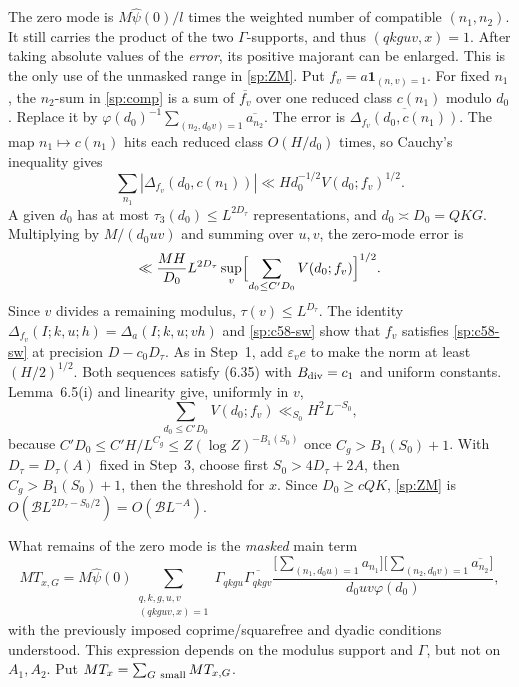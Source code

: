 The zero mode is $M\hat\psi(0)/l$ times the weighted number of compatible
$(n_1,n_2)$. It still carries the product of the two
$\Gamma$-supports, and thus $(qkguv,x)=1$. After taking absolute
values of the \emph{error}, its positive majorant can be enlarged.
This is the only use of the unmasked range in \eqref{sp:ZM}.
Put $f_v=a\mathbf1_{(n,v)=1}$. For fixed $n_1$, the
$n_2$-sum in \eqref{sp:comp} is a sum of $\overline{f_v}$ over one reduced
class $c(n_1)$ modulo $d_0$. Replace it by
$\varphi(d_0)^{-1}\sum_{(n_2,d_0v)=1}\overline{a_{n_2}}$. The error is
$\overline{\Delta_{f_v}(d_0,c(n_1))}$. The map $n_1\mapsto c(n_1)$ hits each
reduced class $O(H/d_0)$ times, so Cauchy's inequality gives
\[
 \sum_{n_1}|\Delta_{f_v}(d_0,c(n_1))|\ll Hd_0^{-1/2}V(d_0;f_v)^{1/2}.
\]
A given $d_0$ has at most $\tau_3(d_0)\le L^{2D_\tau}$ representations, and
$d_0\asymp D_0=QKG$. Multiplying by $M/(d_0uv)$ and summing over $u,v$,
the zero-mode error is
\begin{equation}\label{sp:ZM}
 \ll\frac{MH}{D_0}L^{2D_\tau}\sup_v\Bigl[\sum_{d_0\le C'D_0}V(d_0;f_v)\Bigr]^{1/2}.
\end{equation}
Since $v$ divides a remaining modulus, $\tau(v)\le L^{D_\tau}$. The identity
$\Delta_{f_v}(I;k,u;h)=\Delta_a(I;k,u;vh)$ and \eqref{sp:c58-sw} show that
$f_v$ satisfies \eqref{sp:c58-sw} at precision $D-c_0D_\tau$. As in Step~1, add $\varepsilon_ve$ to make the norm
at least $(H/2)^{1/2}$. Both sequences satisfy (6.35) with $B_{\rm div}=c_1$
and uniform constants. Lemma~6.5(i) and linearity give, uniformly in $v$,
\[
 \sum_{d_0\le C'D_0}V(d_0;f_v)\ll_{S_0}H^2L^{-S_0},
\]
because $C'D_0\le C'H/L^{C_g}\le Z(\log Z)^{-B_1(S_0)}$ once
$C_g>B_1(S_0)+1$. With $D_\tau=D_\tau(A)$ fixed in Step~3, choose first
$S_0>4D_\tau+2A$, then $C_g>B_1(S_0)+1$, then the threshold for $x$.
Since $D_0\ge cQK$, \eqref{sp:ZM} is
$O(\mathcal BL^{2D_\tau-S_0/2})=O(\mathcal BL^{-A})$.

What remains of the zero mode is the \emph{masked} main term
\begin{equation}\label{sp:c58-MT}
 MT_{x,G}=M\hat\psi(0)
 \sum_{\substack{q,k,g,u,v\\(qkguv,x)=1}}
 \Gamma_{qkgu}\overline{\Gamma_{qkgv}}
 \frac{\bigl[\sum_{(n_1,d_0u)=1}a_{n_1}\bigr]
       \bigl[\sum_{(n_2,d_0v)=1}\overline{a_{n_2}}\bigr]}
 {d_0uv\varphi(d_0)} ,
\end{equation}
with the previously imposed coprime/squarefree and dyadic conditions
understood. This expression depends on the modulus support and
$\Gamma$, but not on $A_1,A_2$. Put
$MT_x=\sum_{G\ \rm small}MT_{x,G}$.

